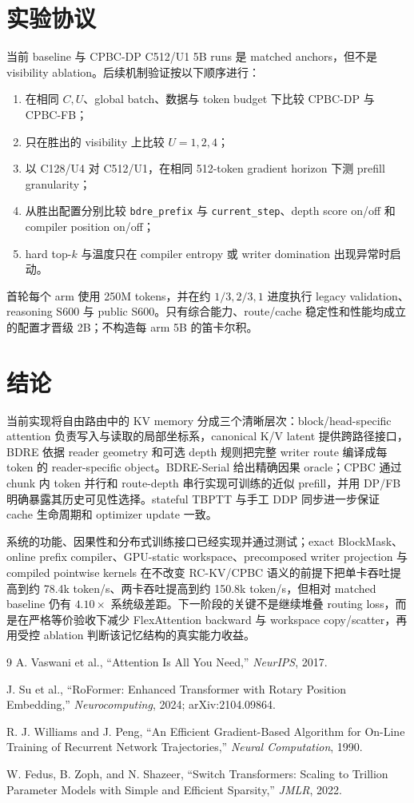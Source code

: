 \documentclass[UTF8,twocolumn,10pt,a4paper]{ctexart}
\newcommand{\RCKV}{\textsf{RC-KV}}
\newcommand{\BDRE}{\textsf{BDRE}}
\newcommand{\CPBC}{\textsf{CPBC}}
\newcommand{\DP}{\textsf{CPBC-DP}}
\newcommand{\FB}{\textsf{CPBC-FB}}
\newcommand{\Serial}{\textsf{BDRE-Serial}}
\newcommand{\code}[1]{\texttt{#1}}
\begin{document}
\section{实验协议}
当前 baseline 与 \DP{} C512/U1 5B runs 是 matched anchors，但不是 visibility ablation。后续机制验证按以下顺序进行：
\begin{enumerate}
  \item 在相同 $C,U$、global batch、数据与 token budget 下比较 \DP{} 与 \FB{}；
  \item 只在胜出的 visibility 上比较 $U=1,2,4$；
  \item 以 C128/U4 对 C512/U1，在相同 512-token gradient horizon 下测 prefill granularity；
  \item 从胜出配置分别比较 \code{bdre\_prefix} 与 \code{current\_step}、depth score on/off 和 compiler position on/off；
  \item hard top-$k$ 与温度只在 compiler entropy 或 writer domination 出现异常时启动。
\end{enumerate}
首轮每个 arm 使用 250M tokens，并在约 $1/3,2/3,1$ 进度执行 legacy validation、reasoning S600 与 public S600。只有综合能力、route/cache 稳定性和性能均成立的配置才晋级 2B；不构造每 arm 5B 的笛卡尔积。

\section{结论}
当前实现将自由路由中的 KV memory 分成三个清晰层次：block/head-specific attention 负责写入与读取的局部坐标系，canonical K/V latent 提供跨路径接口，\BDRE{} 依据 reader geometry 和可选 depth 规则把完整 writer route 编译成每 token 的 reader-specific object。\Serial{} 给出精确因果 oracle；\CPBC{} 通过 chunk 内 token 并行和 route-depth 串行实现可训练的近似 prefill，并用 DP/FB 明确暴露其历史可见性选择。stateful TBPTT 与手工 DDP 同步进一步保证 cache 生命周期和 optimizer update 一致。

系统的功能、因果性和分布式训练接口已经实现并通过测试；exact BlockMask、online prefix compiler、GPU-static workspace、precomposed writer projection 与 compiled pointwise kernels 在不改变 \RCKV{}/\CPBC{} 语义的前提下把单卡吞吐提高到约 78.4k token/s、两卡吞吐提高到约 150.8k token/s，但相对 matched baseline 仍有 $4.10\times$ 系统级差距。下一阶段的关键不是继续堆叠 routing loss，而是在严格等价验收下减少 FlexAttention backward 与 workspace copy/scatter，再用受控 ablation 判断该记忆结构的真实能力收益。

\begin{thebibliography}{9}
\small
{}
A. Vaswani et al., ``Attention Is All You Need,'' \emph{NeurIPS}, 2017.

J. Su et al., ``RoFormer: Enhanced Transformer with Rotary Position Embedding,'' \emph{Neurocomputing}, 2024; arXiv:2104.09864.

R. J. Williams and J. Peng, ``An Efficient Gradient-Based Algorithm for On-Line Training of Recurrent Network Trajectories,'' \emph{Neural Computation}, 1990.

W. Fedus, B. Zoph, and N. Shazeer, ``Switch Transformers: Scaling to Trillion Parameter Models with Simple and Efficient Sparsity,'' \emph{JMLR}, 2022.
\end{thebibliography}
\end{document}
